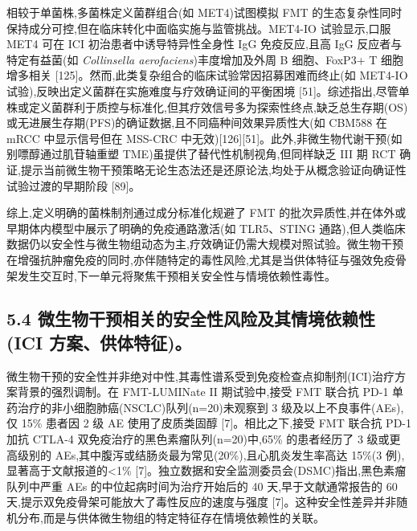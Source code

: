 相较于单菌株,多菌株定义菌群组合(如 MET4)试图模拟 FMT 的生态复杂性同时保持成分可控,但在临床转化中面临实施与监管挑战。MET4-IO 试验显示,口服 MET4 可在 ICI 初治患者中诱导特异性全身性 IgG 免疫反应,且高 IgG 反应者与特定有益菌(如 \emph{Collinsella aerofaciens})丰度增加及外周 B 细胞、FoxP3+ T 细胞增多相关 {[}125{]}。然而,此类复杂组合的临床试验常因招募困难而终止(如 MET4-IO 试验),反映出定义菌群在实施难度与疗效确证间的平衡困境 {[}51{]}。综述指出,尽管单株或定义菌群利于质控与标准化,但其疗效信号多为探索性终点,缺乏总生存期(OS)或无进展生存期(PFS)的确证数据,且不同癌种间效果异质性大(如 CBM588 在 mRCC 中显示信号但在 MSS-CRC 中无效){[}126{]}{[}51{]}。此外,非微生物代谢干预(如别嘌醇通过肌苷轴重塑 TME)虽提供了替代性机制视角,但同样缺乏 III 期 RCT 确证,提示当前微生物干预策略无论生态法还是还原论法,均处于从概念验证向确证性试验过渡的早期阶段 {[}89{]}。

综上,定义明确的菌株制剂通过成分标准化规避了 FMT 的批次异质性,并在体外或早期体内模型中展示了明确的免疫通路激活(如 TLR5、STING 通路),但人类临床数据仍以安全性与微生物组动态为主,疗效确证仍需大规模对照试验。微生物干预在增强抗肿瘤免疫的同时,亦伴随特定的毒性风险,尤其是当供体特征与强效免疫骨架发生交互时,下一单元将聚焦干预相关安全性与情境依赖性毒性。

\subsection{5.4 微生物干预相关的安全性风险及其情境依赖性(ICI 方案、供体特征)。}\label{ux5faeux751fux7269ux5e72ux9884ux76f8ux5173ux7684ux5b89ux5168ux6027ux98ceux9669ux53caux5176ux60c5ux5883ux4f9dux8d56ux6027ici-ux65b9ux6848ux4f9bux4f53ux7279ux5f81}

微生物干预的安全性并非绝对中性,其毒性谱系受到免疫检查点抑制剂(ICI)治疗方案背景的强烈调制。在 FMT-LUMINate II 期试验中,接受 FMT 联合抗 PD-1 单药治疗的非小细胞肺癌(NSCLC)队列(n=20)未观察到 3 级及以上不良事件(AEs),仅 15\% 患者因 2 级 AE 使用了皮质类固醇 {[}7{]}。相比之下,接受 FMT 联合抗 PD-1 加抗 CTLA-4 双免疫治疗的黑色素瘤队列(n=20)中,65\% 的患者经历了 3 级或更高级别的 AEs,其中腹泻或结肠炎最为常见(20\%),且心肌炎发生率高达 15\%(3 例),显著高于文献报道的\textless1\% {[}7{]}。独立数据和安全监测委员会(DSMC)指出,黑色素瘤队列中严重 AEs 的中位起病时间为治疗开始后的 40 天,早于文献通常报告的 60 天,提示双免疫骨架可能放大了毒性反应的速度与强度 {[}7{]}。这种安全性差异并非随机分布,而是与供体微生物组的特定特征存在情境依赖性的关联。

